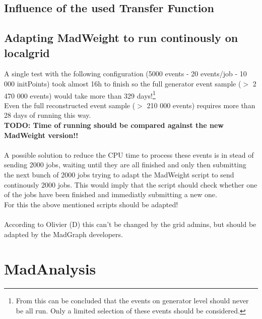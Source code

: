 \documentclass[a4paper,12pt]{report}
\begin{document}
\subsection{Influence of the used Transfer Function}

\subsection{Adapting MadWeight to run continously on localgrid}
A single test with the following configuration (5000 events - 20 events/job - 10 000 initPoints) took almost 16h to finish so the full generator event sample ($>$ 2 470 000 events) would take more than 329 days!\footnote{From this can be concluded that the events on generator level should never be all run. Only a limited selection of these events should be considered.}\\
Even the full reconstructed event sample ($>$ 210 000 events) requires more than 28 days of running this way.\\
\textbf{TODO: Time of running should be compared against the new MadWeight version!!}\\
\\
A possible solution to reduce the CPU time to process these events is in stead of sending 2000 jobs, waiting until they are all finished and only then submitting the next bunch of 2000 jobs trying to adapt the MadWeight script to send continously 2000 jobs. This would imply that the script should check whether one of the jobs have been finished and immediatly submitting a new one.\\
For this the above mentioned scripts should be adapted!\\
\\
According to Olivier (D) this can't be changed by the grid admins, but should be adapted by the MadGraph developers. 

\section{MadAnalysis}
\end{document}
